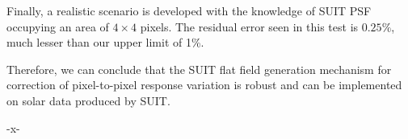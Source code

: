 \documentclass[11pt,a4paper]{article}
\begin{document}
		Finally, a realistic scenario is developed with the knowledge of SUIT PSF occupying an area of $4\times4$ pixels. The residual error seen in this test is $0.25\%$, much lesser than our upper limit of 1\%.
		
		Therefore, we can conclude that the SUIT flat field generation mechanism for correction of pixel-to-pixel response variation is robust and can be implemented on solar data produced by SUIT.


\begin{center}
	-x-
\end{center}
\end{document}
